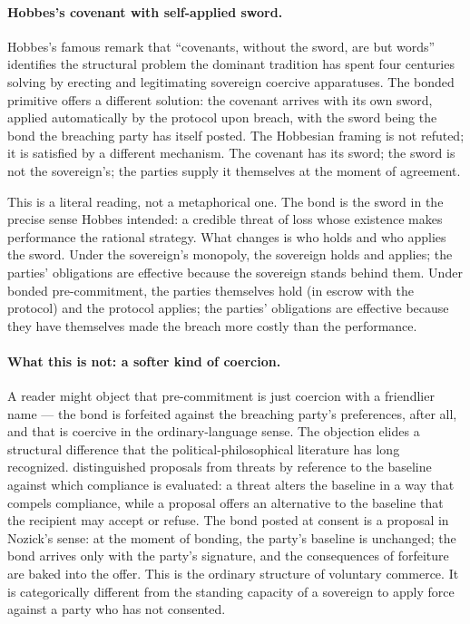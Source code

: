 \documentclass[11pt,a4paper]{article}
\theoremstyle{remark}
\begin{document}
\paragraph{Hobbes's covenant with self-applied sword.}
Hobbes's famous remark that ``covenants, without the sword, are
but words'' identifies the structural problem the dominant
tradition has spent four centuries solving by erecting and
legitimating sovereign coercive apparatuses. The bonded
primitive offers a different solution: the covenant arrives with
its own sword, applied automatically by the protocol upon breach,
with the sword being the bond the breaching party has itself
posted. The Hobbesian framing is not refuted; it is satisfied by
a different mechanism. The covenant has its sword; the sword is
not the sovereign's; the parties supply it themselves at the
moment of agreement.

This is a literal reading, not a metaphorical one. The bond is
the sword in the precise sense Hobbes intended: a credible threat
of loss whose existence makes performance the rational strategy.
What changes is who holds and who applies the sword. Under the
sovereign's monopoly, the sovereign holds and applies; the
parties' obligations are effective because the sovereign stands
behind them. Under bonded pre-commitment, the parties themselves
hold (in escrow with the protocol) and the protocol applies; the
parties' obligations are effective because they have themselves
made the breach more costly than the performance.

\paragraph{What this is not: a softer kind of coercion.}
A reader might object that pre-commitment is just coercion with
a friendlier name --- the bond is forfeited against the breaching
party's preferences, after all, and that is coercive in the
ordinary-language sense. The objection elides a structural
difference that the political-philosophical literature has long
recognized. \citet{nozick1969coercion} distinguished proposals
from threats by reference to the baseline against which
compliance is evaluated: a threat alters the baseline in a way
that compels compliance, while a proposal offers an alternative
to the baseline that the recipient may accept or refuse. The
bond posted at consent is a proposal in Nozick's sense: at the
moment of bonding, the party's baseline is unchanged; the bond
arrives only with the party's signature, and the consequences of
forfeiture are baked into the offer. This is the ordinary
structure of voluntary commerce. It is categorically different
from the standing capacity of a sovereign to apply force against
a party who has not consented.
\end{document}
